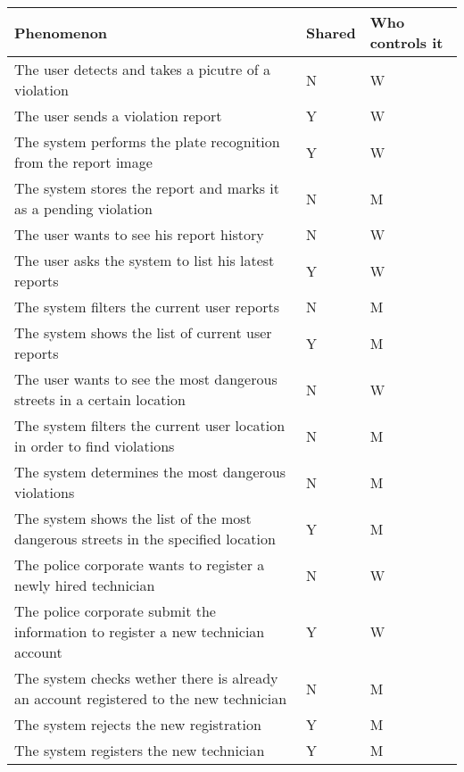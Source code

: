 \begin{longtable}{| p{} | p{} | p{} |} 
      \hline
      Phenomenon & Shared & Who controls it \\
      \hline
      
      The user detects and takes a picutre of a violation & N & W\\
      \hline
      The user sends a violation report & Y & W\\
      \hline
      The system performs the plate recognition from the report image & Y & W\\
      \hline
      The system stores the report and marks it as a pending violation& N & M\\
      \hline
      
      The user wants to see his report history & N & W\\
      \hline
      The user asks the system to list his latest reports & Y & W\\
      \hline
      The system filters the current user reports& N & M\\
      \hline
      The system shows the list of current user reports& Y & M\\
      \hline
      
      The user wants to see the most dangerous streets in a certain location& N & W\\
      \hline
      The system filters the current user location in order to find violations& N & M\\
      \hline
      The system determines the most dangerous violations& N & M\\
      \hline
      The system shows the list of the most dangerous streets in the specified location& Y & M\\
      \hline
      
      The police corporate wants to register a newly hired technician& N & W\\
      \hline
      The police corporate submit the information to register a new technician account& Y & W\\
      \hline
      The system checks wether there is already an account registered to the new technician & N & M\\
      \hline
      The system rejects the new registration & Y & M\\
      \hline
      The system registers the new technician & Y & M\\
      \hline


\end{longtable}
